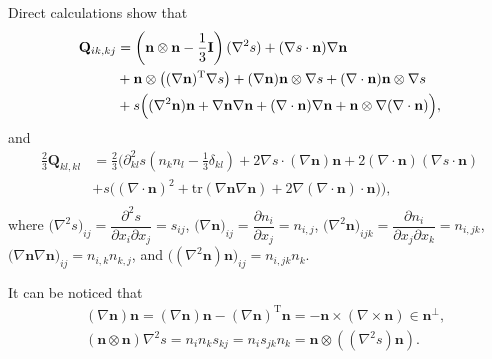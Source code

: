 \documentclass[10pt, a4paper]{article}
\newcommand\n{\mathbf{n}}
\newcommand\Qvec{\mathbf{Q}}
\newcommand\pp{\partial}
\newcommand\tr{\mathrm{tr}}
\begin{document}
Direct calculations show that
\begin{equation}\label{Qikkj}
  \begin{aligned}
    \Qvec_{ik,kj}  & = \left( \n \otimes \n - \frac{1}{3} \mathbf{I} \right) (\nabla^2 s) + (\nabla s \cdot \n) \nabla \n \\
    & + \n \otimes \left( (\nabla \n)^{\mathrm{T}} \nabla s \right) + (\nabla \n) \n \otimes \nabla s + (\nabla \cdot \n) \n \otimes \nabla s \\
    & + s \Bigl( (\nabla^2 \n) \n + \nabla \n \nabla \n + (\nabla \cdot \n) \nabla \n + \n \otimes \nabla (\nabla \cdot \n)  \Bigr), \\
  \end{aligned}
\end{equation}
and 
\begin{equation}
  \begin{aligned}
    \frac{2}{3}  \Qvec_{kl, kl}  & = \frac{2}{3} \biggl( \pp_{kl}^2 s (n_k n_l  - \frac{1}{3} \delta_{kl}) + 2 \nabla s \cdot (\nabla \n) \n + 2 (\nabla \cdot \n) (\nabla s \cdot \n)  \\
    & + s \bigl( (\nabla \cdot \n )^2 + \tr(\nabla \n \nabla \n) + 2  \nabla (\nabla \cdot \n) \cdot \n \bigr) \biggr), \\
  \end{aligned}
\end{equation}
where $ \bigl( \nabla^2 s \bigr)_{ij} = \dfrac{\pp^2 s}{\pp x_i \pp x_j} = s_{ij}$, $ \bigl(\nabla \n \bigr)_{ij} = \dfrac{\pp n_i}{\pp x_j} = n_{i, j} $, $ \bigl( \nabla^2 \n \bigr)_{ijk} = \dfrac{\pp n_i}{\pp x_j \pp x_k} = n_{i, jk} $, $\bigl(\nabla \n \nabla \n \bigr)_{ij} = n_{i, k} n_{k, j}$, 
and $ \bigl( (\nabla^2 \n) \n \bigr)_{ij} = n_{i, jk} n_k$.

It can be noticed that
\begin{equation}
 \begin{aligned}
& (\nabla \n) \n = (\nabla \n) \n - (\nabla \n)^{\mathrm{T}} \n = - \n \times (\nabla \times \n) \in \n^{\perp},  \\
& (\n \otimes \n) \nabla^2 s =  n_i n_k s_{kj} = n_i s_{jk} n_k =  \n \otimes \left( (\nabla^2 s ) \n \right). \\
\end{aligned} 
\end{equation}
\end{document}
